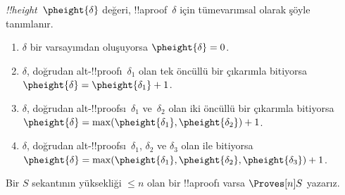 
\begin{defn}
\emph{!!{height}}~$\pheight{\delta}$ değeri, !!a{proof}~$\delta$ için
tümevarımsal olarak şöyle tanımlanır.
\begin{enumerate}
  \item $\delta$ bir varsayımdan oluşuyorsa $\pheight{\delta} = 0$.
  \item $\delta$, doğrudan alt-!!{proof}{}ı~$\delta_1$ olan tek öncüllü bir
  çıkarımla bitiyorsa $\pheight{\delta} = \pheight{\delta_1} + 1$.
  \item $\delta$, doğrudan alt-!!{proof}s{}ı~$\delta_1$ ve~$\delta_2$ olan iki
  öncüllü bir çıkarımla bitiyorsa $\pheight{\delta} =
  \max(\pheight{\delta_1}, \pheight{\delta_2}) + 1$.
  \item $\delta$, doğrudan alt-!!{proof}s{}ı~$\delta_1$, $\delta_2$ ve
  $\delta_3$ olan \Elim{\lor} ile bitiyorsa $\pheight{\delta} =
  \max(\pheight{\delta_1}, \pheight{\delta_2}, \pheight{\delta_3}) + 1$.
\end{enumerate}
Bir $S$ sekantının yüksekliği $\le n$ olan bir !!a{proof}{}ı varsa
$\Proves[n] S$ yazarız.
\end{defn}

